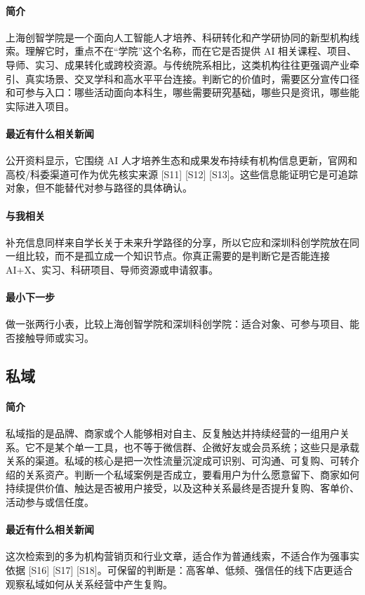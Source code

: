 \documentclass[UTF8,zihao=-4]{ctexart}
\begin{document}
\paragraph{简介} 上海创智学院是一个面向人工智能人才培养、科研转化和产学研协同的新型机构线索。理解它时，重点不在“学院”这个名称，而在它是否提供 AI 相关课程、项目、导师、实习、成果转化或跨校资源。与传统院系相比，这类机构往往更强调产业牵引、真实场景、交叉学科和高水平平台连接。判断它的价值时，需要区分宣传口径和可参与入口：哪些活动面向本科生，哪些需要研究基础，哪些只是资讯，哪些能实际进入项目。
\paragraph{最近有什么相关新闻} 公开资料显示，它围绕 AI 人才培养生态和成果发布持续有机构信息更新，官网和高校/科委渠道可作为优先核实来源 [S11] [S12] [S13]。这些信息能证明它是可追踪对象，但不能替代对参与路径的具体确认。
\paragraph{与我相关} 补充信息同样来自学长关于未来升学路径的分享，所以它应和深圳科创学院放在同一组比较，而不是孤立成一个知识节点。你真正需要的是判断它是否能连接 AI+X、实习、科研项目、导师资源或申请叙事。
\paragraph{最小下一步} 做一张两行小表，比较上海创智学院和深圳科创学院：适合对象、可参与项目、能否接触导师或实习。
\subsection*{私域}
\paragraph{简介} 私域指的是品牌、商家或个人能够相对自主、反复触达并持续经营的一组用户关系。它不是某个单一工具，也不等于微信群、企微好友或会员系统；这些只是承载关系的渠道。私域的核心是把一次性流量沉淀成可识别、可沟通、可复购、可转介绍的关系资产。判断一个私域案例是否成立，要看用户为什么愿意留下、商家如何持续提供价值、触达是否被用户接受，以及这种关系最终是否提升复购、客单价、活动参与或信任度。
\paragraph{最近有什么相关新闻} 这次检索到的多为机构营销页和行业文章，适合作为普通线索，不适合作为强事实依据 [S16] [S17] [S18]。可保留的判断是：高客单、低频、强信任的线下店更适合观察私域如何从关系经营中产生复购。
\end{document}
